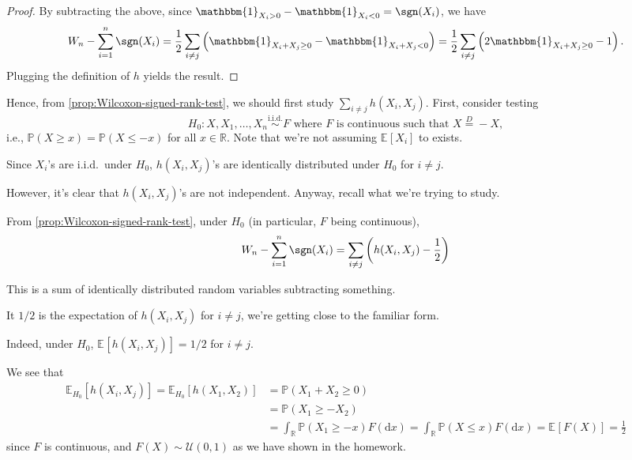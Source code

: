 \begin{proof}
	By subtracting the above, since \(\mathbbm{1}_{X_i > 0} - \mathbbm{1}_{X_i < 0} = \sgn (X_i) \), we have
	\[
		W_n - \sum_{i=1}^{n} \sgn (X_i)
		= \frac{1}{2} \sum_{i \neq j} \left( \mathbbm{1}_{X_i + X_j \geq 0} - \mathbbm{1}_{X_i + X_j < 0} \right)
		= \frac{1}{2} \sum_{i \neq j} \left( 2 \mathbbm{1}_{X_i + X_j \geq 0} - 1 \right).
	\]
	Plugging the definition of \(h\) yields the result.
\end{proof}

Hence, from \autoref{prop:Wilcoxon-signed-rank-test}, we should first study \(\sum_{i \neq j} h(X_i, X_j)\). First, consider testing
\[
	H_0 \colon X, X_1, \dots , X_n \overset{\text{i.i.d.} }{\sim } F \text{ where \(F\) is continuous such that } X \overset{D}{=} -X,
\]
i.e., \(\mathbb{P} (X \geq x) = \mathbb{P} (X \leq -x)\) for all \(x \in \mathbb{R}\). Note that we're not assuming \(\mathbb{E}_{}[X_i] \) to exists.

\begin{note}
	Since \(X_i\)'s are i.i.d.\ under \(H_0\), \(h(X_i, X_j)\)'s are identically distributed under \(H_0\) for \(i \neq j\).
\end{note}

However, it's clear that \(h(X_i, X_j)\)'s are not independent. Anyway, recall what we're trying to study.

\begin{prev}
	From \autoref{prop:Wilcoxon-signed-rank-test}, under \(H_0\) (in particular, \(F\) being continuous),
	\[
		W_n - \sum_{i=1}^{n} \sgn (X_i)
		= \sum_{i \neq j} \left( h(X_i , X_j) - \frac{1}{2} \right)
	\]
\end{prev}
This is a sum of identically distributed random variables subtracting something.

\begin{intuition}
	It \(1 / 2\) is the expectation of \(h(X_i, X_j)\) for \(i \neq j\), we're getting close to the familiar form.
\end{intuition}

\begin{claim}
	Indeed, under \(H_0\), \(\mathbb{E}_{}[h(X_i, X_j)] = 1 / 2\) for \(i \neq j\).
\end{claim}
\begin{explanation}
	We see that
	\[
		\begin{split}
			\mathbb{E}_{H_0}[h(X_i, X_j)]
			= \mathbb{E}_{H_0}[h(X_1, X_2)]
			 & = \mathbb{P} (X_1 + X_2 \geq 0)                             \\
			 & = \mathbb{P} (X_1 \geq -X_2)                                \\
			 & = \int _\mathbb{R} \mathbb{P} (X_1 \geq -x) F(\mathrm{d} x)
			= \int _\mathbb{R} \mathbb{P} (X \leq x) F(\mathrm{d} x)
			= \mathbb{E}_{}[F(X)]
			= \frac{1}{2}
		\end{split}
	\]
	since \(F\) is continuous, and \(F(X) \sim \mathcal{U} (0, 1)\) as we have shown in the homework.
\end{explanation}

